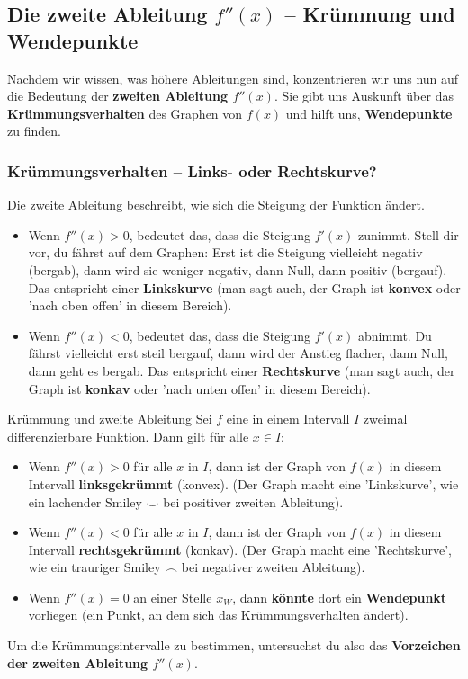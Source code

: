 \subsection{Die zweite Ableitung $f''(x)$ – Krümmung und Wendepunkte}
\label{subsec:zweite_ableitung_neu} 

Nachdem wir wissen, was höhere Ableitungen sind, konzentrieren wir uns nun auf die Bedeutung der \textbf{zweiten Ableitung $f''(x)$}. Sie gibt uns Auskunft über das \textbf{Krümmungsverhalten} des Graphen von $f(x)$ und hilft uns, \textbf{Wendepunkte} zu finden.

\subsubsection{Krümmungsverhalten – Links- oder Rechtskurve?}
Die zweite Ableitung beschreibt, wie sich die Steigung der Funktion ändert.
\begin{itemize}
    \item Wenn $f''(x) > 0$, bedeutet das, dass die Steigung $f'(x)$ zunimmt. Stell dir vor, du fährst auf dem Graphen: Erst ist die Steigung vielleicht negativ (bergab), dann wird sie weniger negativ, dann Null, dann positiv (bergauf). Das entspricht einer \textbf{Linkskurve} (man sagt auch, der Graph ist \textbf{konvex} oder 'nach oben offen' in diesem Bereich).
    \item Wenn $f''(x) < 0$, bedeutet das, dass die Steigung $f'(x)$ abnimmt. Du fährst vielleicht erst steil bergauf, dann wird der Anstieg flacher, dann Null, dann geht es bergab. Das entspricht einer \textbf{Rechtskurve} (man sagt auch, der Graph ist \textbf{konkav} oder 'nach unten offen' in diesem Bereich).
\end{itemize}

\begin{merksatzumgebung}{Krümmung und zweite Ableitung}
Sei $f$ eine in einem Intervall $I$ zweimal differenzierbare Funktion. Dann gilt für alle $x \in I$:
\begin{itemize}
    \item Wenn $f''(x) > 0$ für alle $x$ in $I$, dann ist der Graph von $f(x)$ in diesem Intervall \textbf{linksgekrümmt} (konvex). (Der Graph macht eine 'Linkskurve', wie ein lachender Smiley $\smile$ bei positiver zweiten Ableitung).
    \item Wenn $f''(x) < 0$ für alle $x$ in $I$, dann ist der Graph von $f(x)$ in diesem Intervall \textbf{rechtsgekrümmt} (konkav). (Der Graph macht eine 'Rechtskurve', wie ein trauriger Smiley $\frown$ bei negativer zweiten Ableitung).
    \item Wenn $f''(x) = 0$ an einer Stelle $x_W$, dann \textbf{könnte} dort ein \textbf{Wendepunkt} vorliegen (ein Punkt, an dem sich das Krümmungsverhalten ändert).
\end{itemize}
Um die Krümmungsintervalle zu bestimmen, untersuchst du also das \textbf{Vorzeichen der zweiten Ableitung $f''(x)$}.
\end{merksatzumgebung}

